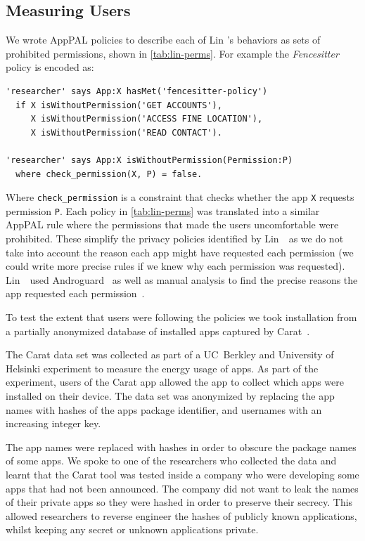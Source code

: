 \documentclass[thesis.tex]{subfiles}
\begin{document}
\subsection{Measuring Users}

We wrote AppPAL policies to describe
each of Lin \etal's behaviors as sets of prohibited permissions, shown in
\autoref{tab:lin-perms}.
%
For example the \emph{Fencesitter} policy is encoded as:
\begin{lstlisting}
'researcher' says App:X hasMet('fencesitter-policy')
  if X isWithoutPermission('GET ACCOUNTS'),
     X isWithoutPermission('ACCESS FINE LOCATION'),
     X isWithoutPermission('READ CONTACT').

'researcher' says App:X isWithoutPermission(Permission:P)
  where check_permission(X, P) = false.
\end{lstlisting}
Where \texttt{check\_permission} is a constraint that checks whether the app \texttt{X} requests permission \texttt{P}.  Each policy in \autoref{tab:lin-perms} was translated into a similar AppPAL rule where the permissions that made the users uncomfortable were prohibited.
%
These simplify the privacy policies
identified by Lin~\etal~as we do not take into account the reason each
app might have requested each permission (we could write more precise
rules if we knew why each permission was requested).  Lin~\etal~used
Androguard~\cite{andrew_desnos_androguard_2012} as well as manual
analysis to find the precise reasons the app requested each
permission~\cite{lin_modeling_2014}.

To test the extent that users were following the policies we took
installation from a partially anonymized database of installed apps
captured by Carat~\cite{oliner_carat:_2013}.

The Carat data set was collected as part of a UC~Berkley and University
of Helsinki experiment to measure the energy usage of apps.  As part
of the experiment, users of the Carat app allowed the app to collect
which apps were installed on their device.  The data set was anonymized
by replacing the app names with hashes of the apps package identifier,
and usernames with an increasing integer key.

The app names were replaced with hashes in order to obscure the package names
of some apps.  We spoke to one of the researchers who collected the data and
learnt that the Carat tool was tested inside a company who were developing some
apps that had not been announced.  The company did not want to leak the names
of their private apps so they were hashed in order to preserve their secrecy.
This allowed researchers to reverse engineer the hashes of publicly known
applications, whilst keeping any secret or unknown applications private.
\end{document}
